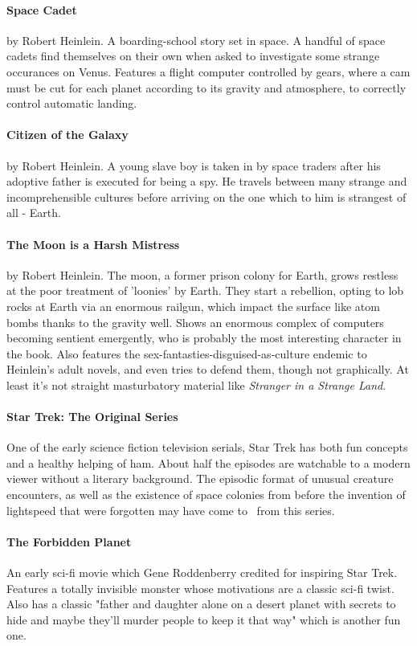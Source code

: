 \paragraph{Space Cadet}
by Robert Heinlein. A boarding-school story set in space. A handful of space cadets find themselves on their own when asked to investigate some strange occurances on Venus. Features a flight computer controlled by gears, where a cam must be cut for each planet according to its gravity and atmosphere, to correctly control automatic landing.

\paragraph{Citizen of the Galaxy}
by Robert Heinlein. A young slave boy is taken in by space traders after his adoptive father is executed for being a spy. He travels between many strange and incomprehensible cultures before arriving on the one which to him is strangest of all - Earth.

\paragraph{The Moon is a Harsh Mistress}
by Robert Heinlein. The moon, a former prison colony for Earth, grows restless at the poor treatment of 'loonies' by Earth. They start a rebellion, opting to lob rocks at Earth via an enormous railgun, which impact the surface like atom bombs thanks to the gravity well. Shows an enormous complex of computers becoming sentient emergently, who is probably the most interesting character in the book. Also features the sex-fantasties-disguised-as-culture endemic to Heinlein's adult novels, and even tries to defend them, though not graphically. {\tiny At least it's not straight masturbatory material like \textit{Stranger in a Strange Land}.}

\paragraph{Star Trek: The Original Series}
One of the early science fiction television serials, Star Trek has both fun concepts and a healthy helping of ham. About half the episodes are watchable to a modern viewer without a literary background. The episodic format of unusual creature encounters, as well as the existence of space colonies from before the invention of lightspeed that were forgotten may have come to \getTitle\, from this series.

\paragraph{The Forbidden Planet}
An early sci-fi movie which Gene Roddenberry credited for inspiring Star Trek. Features a totally invisible monster whose motivations are a classic sci-fi twist. Also has a classic "father and daughter alone on a desert planet with secrets to hide and maybe they'll murder people to keep it that way" which is another fun one.

